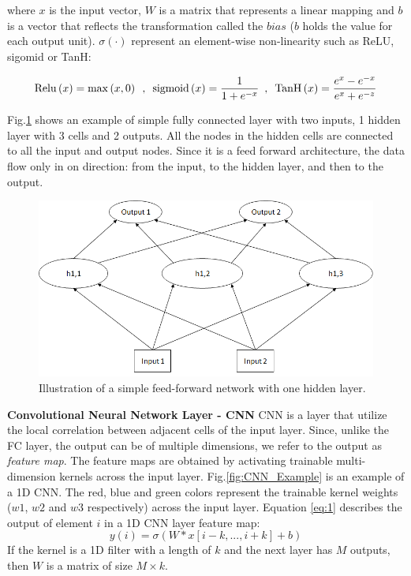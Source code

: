 \documentclass[
12pt, %
english, %
doublespacing, %
headsepline, %
]{MastersDoctoralThesis} %
\begin{document}
where $x$ is the input vector, $W$ is a matrix that represents a linear mapping and $b$ is a vector that reflects the transformation called the $bias$ ($b$ holds the value for each output unit). $\sigma \left( \cdot \right)$ represent an element-wise non-linearity such as ReLU, sigomid or TanH:

\[{\rm{Relu}}\left( x \right) = \max \left( {x,0} \right) \,\,\,,\,\,\,{\rm{sigmoid}}\left( x \right) = \frac{1}{{1 + {e^{ - x}}}}\,\,\,,\,\,\,{\mathop{\rm Tan}\nolimits} {\rm{H}}\left( x \right) = \frac{{{e^x} - {e^{ - x}}}}{{{e^x} + {e^{ - z}}}}\]

Fig.\ref{fig:FF_Example} shows an example of simple fully connected layer with two inputs, 1 hidden layer with 3 cells and 2 outputs. All the nodes in the hidden cells are connected to all the input and output nodes. Since it is a feed forward architecture, the data flow only in on direction: from the input, to the hidden layer, and then to the output.
\begin{figure}
\centering
\includegraphics[width=0.7\linewidth]{Figures/FF_Example_v2}
\caption{Illustration of a simple feed-forward network with one hidden layer.}
\label{fig:FF_Example}
\end{figure}

\textbf{Convolutional Neural Network Layer - CNN } CNN is a layer that utilize the local correlation between adjacent cells of the input layer. Since, unlike the FC layer, the output can be of multiple dimensions, we refer to the output as \textit{feature map}. The feature maps are obtained by activating trainable multi-dimension kernels across the input layer. Fig.\ref{fig:CNN_Example} is an example of a 1D CNN. The red, blue and green colors represent the trainable kernel weights ($w1$, $w2$ and $w3$ respectively) across the input layer. Equation \ref{eq:1} describes the output of element $i$ in a 1D CNN layer feature map:
\begin{equation} \label{eq:1}
y\left( i \right) = \sigma \left( {W * x\left[ {i - k,...,i + k} \right] + b} \right)
\end{equation}
If the kernel is a 1D filter with a length of $k$ and the next layer has $M$ outputs, then $W$ is a matrix of size $M \times k$.
\end{document}
